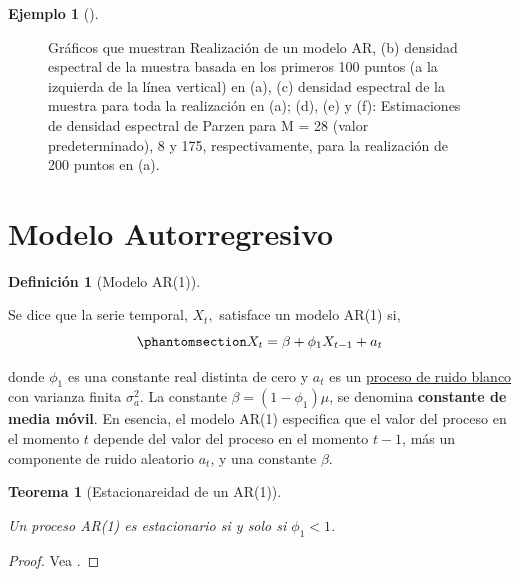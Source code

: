\documentclass[
  us-letterpaper,
]{scrreprt}
\theoremstyle{plain}
\newtheorem{theorem}{Teorema}[chapter]
\theoremstyle{definition}
\newtheorem{definition}{Definición}[chapter]
\theoremstyle{definition}
\newtheorem{example}{Ejemplo}[chapter]
\theoremstyle{remark}
\begin{document}
\begin{example}[]
\begin{tcolorbox}
\begin{figure}[H]
{}

\caption{\label{fig-sampleespectral}Gráficos que muestran Realización de
un modelo AR, (b) densidad espectral de la muestra basada en los
primeros 100 puntos (a la izquierda de la línea vertical) en (a), (c)
densidad espectral de la muestra para toda la realización en (a); (d),
(e) y (f): Estimaciones de densidad espectral de Parzen para M = 28
(valor predeterminado), 8 y 175, respectivamente, para la realización de
200 puntos en (a).}

\end{figure}%

\end{tcolorbox}

\end{example}

\section{Modelo Autorregresivo}\label{sec-AR}

\begin{definition}[Modelo
AR(1)]\protect\hypertarget{def-AR1}{}\label{def-AR1}

Se dice que la serie temporal, \(X_t,\) satisface un modelo AR(1) si,
\begin{equation}\phantomsection\label{eq-ar1}{
X_t = \beta + \phi_1 X_{t-1} + a_t
}\end{equation}

\end{definition}

donde \(\phi_1\) es una constante real distinta de cero y \(a_t\) es un
\hyperref[sec-ruidob]{proceso de ruido blanco} con varianza finita
\(\sigma_a^2.\) La constante \(\beta = (1- \phi_1) \mu\), se denomina
\textbf{constante de media móvil}. En esencia, el modelo AR(1)
especifica que el valor del proceso en el momento \(t\) depende del
valor del proceso en el momento \(t −1\), más un componente de ruido
aleatorio \(a_t\), y una constante \(\beta\).

\begin{theorem}[Estacionareidad de un
AR(1)]\protect\hypertarget{thm-AR1es}{}\label{thm-AR1es}

Un proceso AR(1) es estacionario si y solo si \(\phi_1 < 1\).

\end{theorem}

\begin{proof}
Vea \textcite{woodward2017applied}.
\end{proof}
\end{document}
